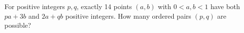 For positive integers $p,q$, exactly 14 points $(a,b)$ with $0<a,b<1$ have both $pa+3b$ and $2a+qb$ positive integers. How many ordered pairs $(p,q)$ are possible?
